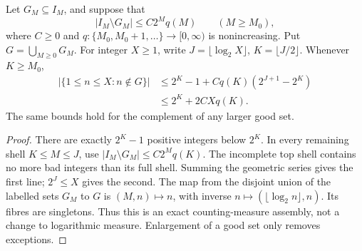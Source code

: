 \begin{lemma}
\label{lem:Shaik-antitone-assembly}
Let \(G_M\subseteq I_M\), and suppose that
\[
 |I_M\setminus G_M|\le C2^M q(M)\qquad(M\ge M_0),
\]
where \(C\ge0\) and \(q:\{M_0,M_0+1,\ldots\}\to[0,\infty)\) is
nonincreasing. Put \(G=\bigcup_{M\ge0}G_M\). For integer \(X\ge1\), write
\(J=\lfloor\log_2X\rfloor\), \(K=\lfloor J/2\rfloor\).
Whenever \(K\ge M_0\),
\begin{equation}\label{eq:Shaik-antitone-prefix}
 \begin{split}
 |\{1\le n\le X:n\notin G\}|
 &\le 2^K-1+Cq(K)(2^{J+1}-2^K)\\
 &\le 2^K+2CXq(K).
 \end{split}
\end{equation}
The same bounds hold for the complement of any larger good set.
\end{lemma}
\begin{proof}
There are exactly \(2^K-1\) positive integers below \(2^K\).
In every remaining shell \(K\le M\le J\), use
\(|I_M\setminus G_M|\le C2^M q(K)\). The incomplete top shell contains
no more bad integers than its full shell. Summing the geometric series
gives the first line; \(2^J\le X\) gives the second.
The map from the disjoint union of the labelled sets \(G_M\) to \(G\)
is \((M,n)\mapsto n\), with inverse
\(n\mapsto(\lfloor\log_2n\rfloor,n)\). Its fibres are singletons.
Thus this is an exact counting-measure assembly, not a change to
logarithmic measure. Enlargement of a good set only removes exceptions.
\end{proof}

